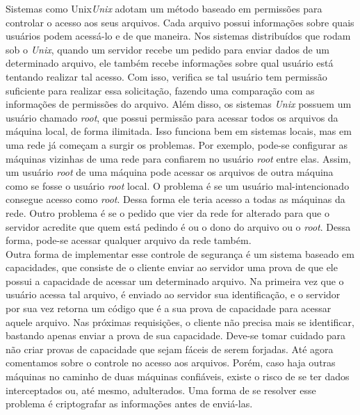 	
	Sistemas como Unix\textit{Unix} adotam um método baseado em permissões para controlar o acesso aos seus arquivos.
	Cada arquivo possui informações sobre quais usuários podem acessá-lo e de que maneira.
	Nos sistemas distribuídos que rodam sob o \textit{Unix}, quando um servidor recebe um pedido para enviar dados de um determinado arquivo, ele também recebe informações sobre qual usuário está tentando realizar tal acesso. Com isso, verifica se tal usuário tem permissão suficiente para realizar essa solicitação, fazendo uma comparação com as informações de permissões do arquivo.
	Além disso, os sistemas \textit{Unix} possuem um usuário chamado \textit{root}, que possui permissão para acessar todos os arquivos da máquina local, de forma ilimitada. Isso funciona bem em sistemas locais, mas em uma rede já começam a surgir os problemas.
	Por exemplo, pode-se configurar as máquinas vizinhas de uma rede para confiarem no usuário \textit{root} entre elas. Assim, um usuário \textit{root} de uma máquina pode acessar os arquivos de outra máquina como se fosse o usuário \textit{root} local. O problema é se um usuário mal-intencionado consegue acesso como \textit{root}. Dessa forma ele teria acesso a todas as máquinas da rede. Outro problema é se o pedido que vier da rede for alterado para que o servidor acredite que quem está pedindo é ou o dono do arquivo ou o \textit{root}. Dessa forma, pode-se acessar qualquer arquivo da rede também. \\
	
	Outra forma de implementar esse controle de segurança é um sistema baseado em capacidades, que consiste de o cliente enviar ao servidor uma prova de que ele possui a capacidade de acessar um determinado arquivo. Na primeira vez que o usuário acessa tal arquivo, é enviado ao servidor sua identificação, e o servidor por sua vez retorna um código que é a sua prova de capacidade para acessar aquele arquivo. Nas próximas requisições, o cliente não precisa mais se identificar, bastando apenas enviar a prova de sua capacidade. Deve-se tomar cuidado para não criar provas de capacidade que sejam fáceis de serem forjadas. Até agora comentamos sobre o controle no acesso aos arquivos. Porém, caso haja outras máquinas no caminho de duas máquinas confiáveis, existe o risco de se ter dados interceptados ou, até mesmo, adulterados. Uma forma de se resolver esse problema é criptografar as informações antes de enviá-las.
	
	
